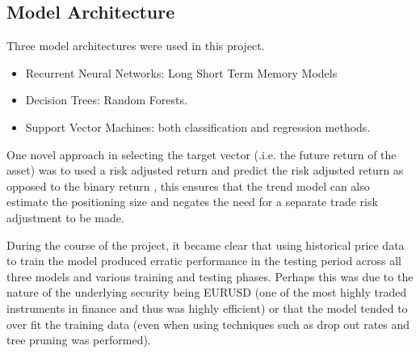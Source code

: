 \documentclass[11pt]{article}
\begin{document}
\subsection{Model Architecture}
Three model architectures were used in this project.
\begin{itemize}
 \item Recurrent Neural Networks: Long Short Term Memory Models
\item Decision Trees: Random Forests.
\item Support Vector Machines: both classification and regression methods. 
\end{itemize}
One novel approach in selecting the target vector (.i.e. the future return of the asset) was to used a risk adjusted return and predict the risk adjusted return as opposed to the binary return \cite{Lim2019}, this ensures that the trend model can also estimate the positioning size and negates the need for a separate trade risk adjustment to be made. \newline
 
During the course of the project, it became clear that using historical price data to train the model produced erratic performance in the testing period across all three models and various training and testing phases. Perhaps this was due to the nature of the underlying security being EURUSD (one of the most highly traded instruments in finance and thus was highly efficient) or that the model tended to over fit the training data (even when using techniques such as drop out rates and tree pruning was performed). 
\end{document}
